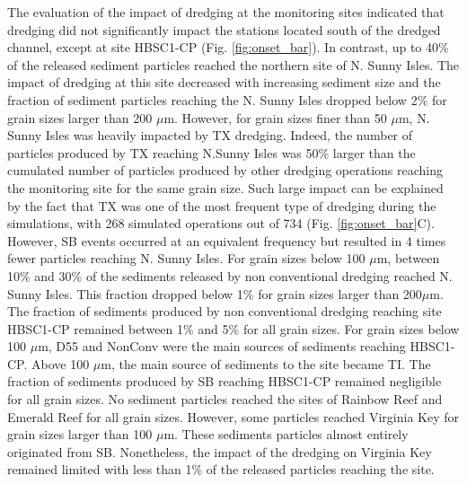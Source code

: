 \documentclass[preprint,12pt,authoryear]{elsarticle}
\begin{document}
The evaluation of the impact of dredging at the monitoring sites indicated that dredging did not significantly impact the stations located south of the dredged channel, except at site HBSC1-CP (Fig. \ref{fig:onset_bar}). In contrast, up to 40\% of the released sediment particles reached the northern site of N. Sunny Isles. The impact of dredging at this site decreased with increasing sediment size and the fraction of sediment particles reaching the N. Sunny Isles dropped below 2\% for grain sizes larger than 200 $\mu$m. However, for grain sizes finer than 50 $\mu$m, N. Sunny Isles was heavily impacted by TX dredging. Indeed, the number of particles produced by TX reaching N.Sunny Isles was 50\% larger than the cumulated number of particles produced by other dredging operations reaching the monitoring site for the same grain size. Such large impact can be explained by the fact that TX was one of the most frequent type of dredging during the simulations, with 268 simulated operations out of 734 (Fig. \ref{fig:onset_bar}C). However, SB events occurred at an equivalent frequency but resulted in 4 times fewer particles reaching N. Sunny Isles. For grain sizes below 100 $\mu$m, between 10\% and 30\% of the sediments released by non conventional dredging reached N. Sunny Isles. This fraction dropped below  1\% for grain sizes larger than 200$\mu$m. The fraction of sediments produced by non conventional dredging reaching site HBSC1-CP remained between 1\% and 5\% for all grain sizes. For grain sizes below 100 $\mu$m, D55 and NonConv were the main sources of sediments reaching HBSC1-CP. Above 100 $\mu$m, the main source of sediments to the site became TI. The fraction of sediments produced by SB reaching HBSC1-CP remained negligible for all grain sizes. No sediment particles reached the sites of Rainbow Reef and Emerald Reef for all grain sizes. However, some particles reached Virginia Key for grain sizes larger than 100 $\mu$m. These sediments particles almost entirely originated from SB. Nonetheless, the impact of the dredging on Virginia Key remained limited with less than 1$\%$ of the released particles reaching the site.
\end{document}
